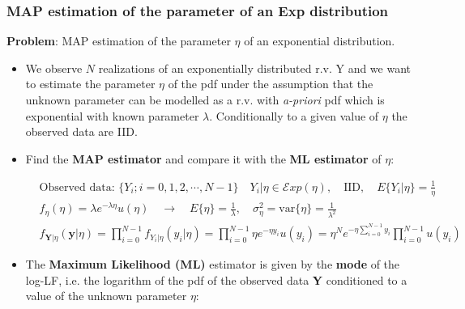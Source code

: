 \subsubsection{MAP estimation of the parameter of an Exp distribution}
\noindent \textbf{Problem}: MAP estimation of the parameter \(\eta\) of an exponential distribution.
\begin{itemize}
    \item We observe \(N\) realizations of an exponentially distributed r.v. Y and we want to estimate the parameter \(\eta\) of the pdf under the assumption that the unknown parameter can be modelled as a r.v. with \textit{a-priori} pdf which is exponential with known parameter \(\lambda\). Conditionally to a given value of \(\eta\) the observed data are IID.
    \item Find the \textbf{MAP estimator} and compare it with the \textbf{ML estimator} of \(\eta\):

    \begin{align*}
& \text{Observed data: } \{ Y_i; i = 0, 1, 2, \cdots, N-1 \} \quad Y_i | \eta \in \mathcal{E}xp(\eta), \quad \text{IID}, \quad E\{Y_i|\eta\} = \frac{1}{\eta} \\[10pt]
& f_\eta(\eta) = \lambda e^{-\lambda \eta} u(\eta) \quad \rightarrow \quad E\{\eta\} = \frac{1}{\lambda}, \quad \sigma_\eta^2 = \text{var}\{\eta\} = \frac{1}{\lambda^2} \\[10pt]
& f_{\mathbf{Y}|\eta}(\mathbf{y}|\eta) = \prod_{i=0}^{N-1} f_{Y_i|\eta}(y_i|\eta) = \prod_{i=0}^{N-1} \eta e^{-\eta y_i} u(y_i) = \eta^N e^{-\eta \sum_{i=0}^{N-1} y_i} \prod_{i=0}^{N-1} u(y_i)
\end{align*}

\item The \textbf{Maximum Likelihood (ML)} estimator is given by the \textbf{mode} of the log-LF, i.e. the logarithm of the pdf of the observed data \textbf{Y} conditioned to a value of the unknown parameter \(\eta\):


\end{itemize}
